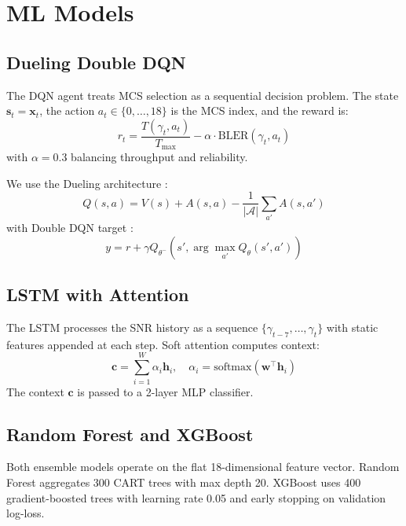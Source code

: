 \documentclass[conference]{IEEEtran}
\begin{document}
\section{ML Models}

\subsection{Dueling Double DQN}

The DQN agent treats MCS selection as a sequential decision problem. The
state $\mathbf{s}_t = \mathbf{x}_t$, the action $a_t \in \{0,\ldots,18\}$ is
the MCS index, and the reward is:
\begin{equation}
  r_t = \frac{T(\gamma_t, a_t)}{T_{\max}} - \alpha \cdot \text{BLER}(\gamma_t, a_t)
\end{equation}
with $\alpha = 0.3$ balancing throughput and reliability.

We use the Dueling architecture \cite{wang2016dueling}:
\begin{equation}
  Q(s,a) = V(s) + A(s,a) - \frac{1}{|\mathcal{A}|}\sum_{a'} A(s,a')
\end{equation}
with Double DQN target \cite{hasselt2016deep}:
\begin{equation}
  y = r + \gamma Q_{\theta^-}(s', \arg\max_{a'} Q_\theta(s', a'))
\end{equation}

\subsection{LSTM with Attention}

The LSTM processes the SNR history as a sequence
$\{\gamma_{t-7}, \ldots, \gamma_t\}$ with static features appended at each
step. Soft attention \cite{bahdanau2015} computes context:
\begin{equation}
  \mathbf{c} = \sum_{i=1}^{W} \alpha_i \mathbf{h}_i, \quad
  \alpha_i = \text{softmax}(\mathbf{w}^\top \mathbf{h}_i)
\end{equation}
The context $\mathbf{c}$ is passed to a 2-layer MLP classifier.

\subsection{Random Forest and XGBoost}

Both ensemble models operate on the flat 18-dimensional feature vector.
Random Forest aggregates 300 CART trees with max depth 20. XGBoost
\cite{chen2016xgboost} uses 400 gradient-boosted trees with learning rate
0.05 and early stopping on validation log-loss.
\end{document}
